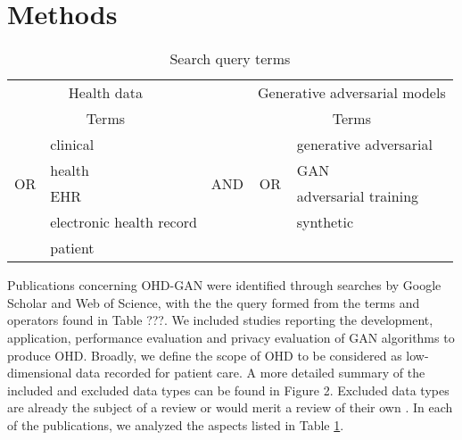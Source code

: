 \section{Methods}

\begin{table}[h]
  \center
    \begin{tabular}{@{}clccl@{}} \toprule
	    \multicolumn{2}{c}{Health data} & & \multicolumn{2}{c}{Generative adversarial models} \\ \cmidrule{1-2} \cmidrule{4-5}
	    \multicolumn{2}{c}{Terms} & {} & \multicolumn{2}{c}{Terms} \\ \cmidrule{2-2} \cmidrule{5-5}
	    \multirow{4}{*}{OR} & clinical & \multirow[t]{4}{*}{\quad AND\quad} & \multirow{4}{*}{OR} & generative adversarial\\
	    {} & health & {} & {} & GAN \\ 
	    {} & EHR & {} & {} & adversarial training \\
	    {} & electronic health record & {} & {} & synthetic  \\
	    {} & patient & {} & {} & {} \\
	    \bottomrule
    \end{tabular}
    \caption{{Search query terms}}\label{tab:search}
\end{table}

Publications concerning OHD-GAN were identified through searches by Google Scholar and Web of Science, with the the query formed from the terms and operators found in Table ???. We included studies reporting the development, application, performance evaluation and privacy evaluation of GAN algorithms to produce OHD. Broadly, we define the scope of OHD to be considered as low-dimensional data recorded for patient care. A more detailed summary of the included and excluded data types can be found in Figure 2. Excluded data types are already the subject of a review or would merit a review of their own \cite{Yi_2019}\cite{Nakata2019}\cite{Anwar_2018}. In each of the publications, we analyzed the aspects listed in Table \ref{tab:search}.\par








